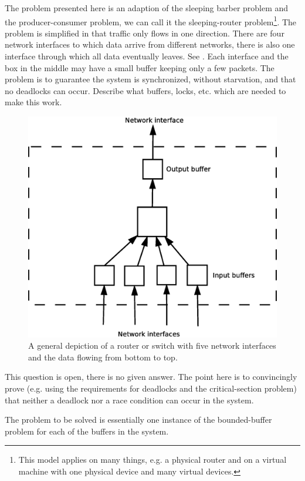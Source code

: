 \documentclass[a4paper,nocourse]{miunasgn}
\begin{document}
\begin{questions}

	\question\label{q:sleepingrouter}
	The problem presented here is an adaption of the sleeping barber problem and 
	the producer-consumer problem, we can call it the sleeping-router 
	problem\footnote{%
		This model applies on many things, e.g. a physical router and on a virtual 
		machine with one physical device and many virtual devices.
	}.
	The problem is simplified in that traffic only flows in one direction.
	There are four network interfaces to which data arrive from different 
	networks, there is also one interface through which all data eventually 
	leaves.
	See .
	Each interface and the box in the middle may have a small buffer keeping only 
	a few packets.
	The problem is to guarantee the system is synchronized, without starvation, 
	and that no deadlocks can occur.
	Describe what buffers, locks, etc. which are needed to make this work.
	\begin{figure}
		\centering
		\includegraphics[width=0.7\linewidth]{router.eps}
		\caption{A general depiction of a router or switch with five network 
		interfaces and the data flowing from bottom to top.}
		\label{fig:router}
	\end{figure}
	\begin{solution}
		This question is open, there is no given answer.
		The point here is to convincingly prove (e.g. using the requirements for 
		deadlocks and the critical-section problem) that neither a deadlock nor 
		a race condition can occur in the system.

		The problem to be solved is essentially one instance of the bounded-buffer 
		problem \citep[see][sec. 6.6.1]{Silberschatz2009osc} for each of the 
		buffers in the system.


\end{solution}
\end{questions}
\end{document}
